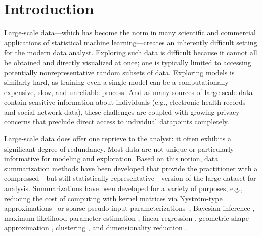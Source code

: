 \section{Introduction}
\label{sec:intro}


Large-scale data---which has become the norm in many scientific and commercial applications of statistical machine learning---creates
an inherently difficult setting for the modern data analyst. Exploring such data is difficult because it cannot all be
obtained and directly visualized at once; one is typically limited to accessing potentially nonrepresentative random subsets of data.
Exploring models is similarly hard, as training even a single model can be a computationally expensive, slow, and unreliable process.
And as many sources of large-scale data contain sensitive information about 
individuals (e.g., electronic health records and social network data),
these challenges are coupled with growing privacy concerns  that preclude direct access to individual datapoints completely. 

Large-scale data does offer one reprieve to the analyst: it often exhibits a significant degree of redundancy. Most data are 
not unique or particularly informative for modeling and exploration. Based on this notion, data summarization methods have been developed  
that provide the practitioner with a compressed---but still statistically representative---version of the large dataset for analysis.
Summarizations have been developed for a variety of purposes, e.g., reducing the cost of computing with kernel matrices via Nystr{\"o}m-type approximations~\citep{drineas05,musco17,agrawal19} or sparse pseudo-input parameterizations~\citep{snelson05},
Bayesian inference \citep{huggins16,huggins17,campbell18,campbell19jmlr}, maximum likelihood 
parameter estimation \citep{dumouchel99,madigan02}, 
linear regression \citep{zhou08,guhaniyogi15},
geometric shape approximation \citep{agarwal05},
clustering \citep{feldman11,lucic16,bachem15,braverman16}, and dimensionality reduction \citep{feldman16}.


